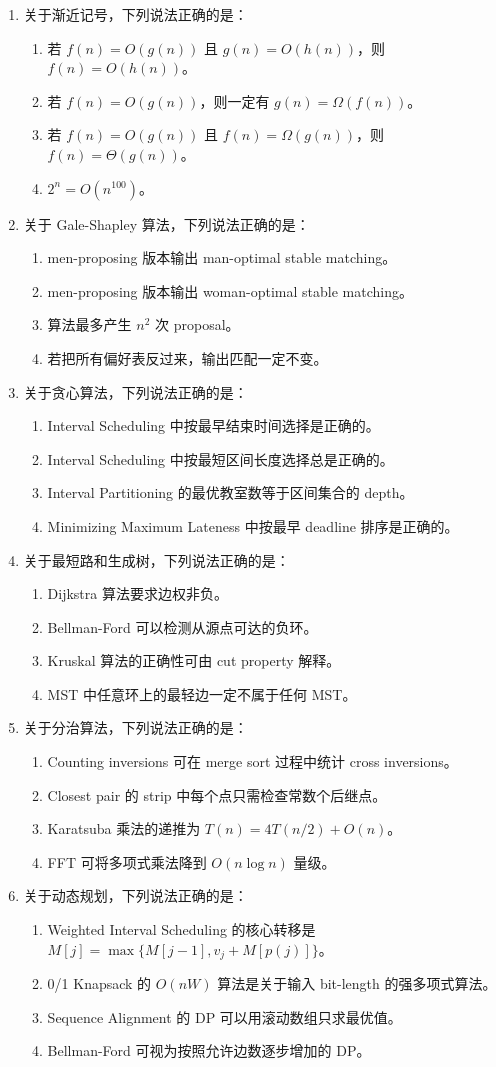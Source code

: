 \documentclass[UTF8,a4paper,11pt]{ctexart}
\newcommand{\choice}[1]{\item[$\square$] #1}
\begin{document}
\begin{enumerate}
  \item 关于渐近记号，下列说法正确的是：
  \begin{enumerate}
    \choice{若 $f(n)=O(g(n))$ 且 $g(n)=O(h(n))$，则 $f(n)=O(h(n))$。}
    \choice{若 $f(n)=O(g(n))$，则一定有 $g(n)=\Omega(f(n))$。}
    \choice{若 $f(n)=O(g(n))$ 且 $f(n)=\Omega(g(n))$，则 $f(n)=\Theta(g(n))$。}
    \choice{$2^n=O(n^{100})$。}
  \end{enumerate}

  \item 关于 Gale-Shapley 算法，下列说法正确的是：
  \begin{enumerate}
    \choice{men-proposing 版本输出 man-optimal stable matching。}
    \choice{men-proposing 版本输出 woman-optimal stable matching。}
    \choice{算法最多产生 $n^2$ 次 proposal。}
    \choice{若把所有偏好表反过来，输出匹配一定不变。}
  \end{enumerate}

  \item 关于贪心算法，下列说法正确的是：
  \begin{enumerate}
    \choice{Interval Scheduling 中按最早结束时间选择是正确的。}
    \choice{Interval Scheduling 中按最短区间长度选择总是正确的。}
    \choice{Interval Partitioning 的最优教室数等于区间集合的 depth。}
    \choice{Minimizing Maximum Lateness 中按最早 deadline 排序是正确的。}
  \end{enumerate}

  \item 关于最短路和生成树，下列说法正确的是：
  \begin{enumerate}
    \choice{Dijkstra 算法要求边权非负。}
    \choice{Bellman-Ford 可以检测从源点可达的负环。}
    \choice{Kruskal 算法的正确性可由 cut property 解释。}
    \choice{MST 中任意环上的最轻边一定不属于任何 MST。}
  \end{enumerate}

  \item 关于分治算法，下列说法正确的是：
  \begin{enumerate}
    \choice{Counting inversions 可在 merge sort 过程中统计 cross inversions。}
    \choice{Closest pair 的 strip 中每个点只需检查常数个后继点。}
    \choice{Karatsuba 乘法的递推为 $T(n)=4T(n/2)+O(n)$。}
    \choice{FFT 可将多项式乘法降到 $O(n\log n)$ 量级。}
  \end{enumerate}

  \item 关于动态规划，下列说法正确的是：
  \begin{enumerate}
    \choice{Weighted Interval Scheduling 的核心转移是 $M[j]=\max\{M[j-1],v_j+M[p(j)]\}$。}
    \choice{0/1 Knapsack 的 $O(nW)$ 算法是关于输入 bit-length 的强多项式算法。}
    \choice{Sequence Alignment 的 DP 可以用滚动数组只求最优值。}
    \choice{Bellman-Ford 可视为按照允许边数逐步增加的 DP。}
  \end{enumerate}


\end{enumerate}
\end{document}
